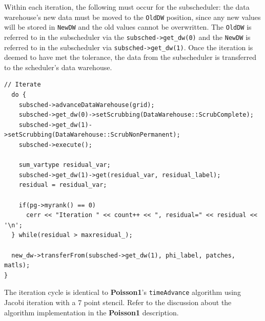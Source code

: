 \documentclass[12pt]{report}
\begin{document}
Within each iteration, the following must occur for the subscheduler:
the data warehouse's new data must be moved to the \texttt{OldDW}
position, since any new values will be stored in \texttt{NewDW} and
the old values cannot be overwritten.  The \texttt{OldDW} is referred
to in the subscheduler via the \texttt{subsched->get\_dw(0)} and the
\texttt{NewDW} is referred to in the subscheduler via
\texttt{subsched->get\_dw(1)}.  Once the iteration is deemed to have
met the tolerance, the data from the subscheduler is transferred to
the scheduler's data warehouse.

\begin{Verbatim}[fontsize=\footnotesize]
  // Iterate
  do {
    subsched->advanceDataWarehouse(grid);
    subsched->get_dw(0)->setScrubbing(DataWarehouse::ScrubComplete);
    subsched->get_dw(1)->setScrubbing(DataWarehouse::ScrubNonPermanent);
    subsched->execute();    

    sum_vartype residual_var;
    subsched->get_dw(1)->get(residual_var, residual_label);
    residual = residual_var;

    if(pg->myrank() == 0)
      cerr << "Iteration " << count++ << ", residual=" << residual << '\n';
  } while(residual > maxresidual_);

  new_dw->transferFrom(subsched->get_dw(1), phi_label, patches, matls);
}

\end{Verbatim}

The iteration cycle is identical to \textbf{Poisson1}'s
\texttt{timeAdvance} algorithm using Jacobi iteration with a 7 point
stencil.  Refer to the discussion about the algorithm implementation
in the \textbf{Poisson1} description.
\end{document}
